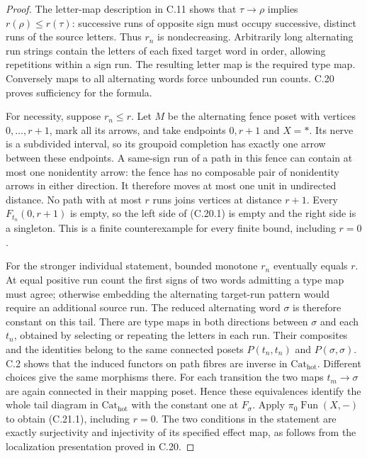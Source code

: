 \begin{proof}
The letter-map description in C.11 shows that $\tau\to\rho$
implies $r(\rho)\leq r(\tau)$: successive runs of opposite sign
must occupy successive, distinct runs of the source letters.
Thus $r_n$ is nondecreasing. Arbitrarily long alternating run
strings contain the letters of each fixed target word in order,
allowing repetitions within a sign run. The resulting letter map
is the required type map. Conversely maps to all alternating words
force unbounded run counts. C.20 proves sufficiency for the formula.

For necessity, suppose $r_n\leq r$. Let $M$ be the alternating
fence poset with vertices $0,\ldots,r+1$, mark all its arrows,
and take endpoints $0,r+1$ and $X=*$. Its nerve is a subdivided
interval, so its groupoid completion has exactly one arrow between
these endpoints. A same-sign run of a path in this fence can
contain at most one nonidentity arrow: the fence has no composable
pair of nonidentity arrows in either direction. It therefore moves
at most one unit in undirected distance. No path with at most $r$
runs joins vertices at distance $r+1$. Every $F_{t_n}(0,r+1)$
is empty, so the left side of (C.20.1) is empty and the right side
is a singleton. This is a finite counterexample for every finite
bound, including $r=0$.

For the stronger individual statement, bounded monotone $r_n$
eventually equals $r$. At equal positive run count the first signs
of two words admitting a type map must agree; otherwise embedding
the alternating target-run pattern would require an additional
source run. The reduced alternating word $\sigma$ is therefore
constant on this tail. There are type maps in both directions
between $\sigma$ and each $t_n$, obtained by selecting or
repeating the letters in each run. Their composites and the
identities belong to the same connected posets $P(t_n,t_n)$ and
$P(\sigma,\sigma)$. C.2 shows that the induced functors on path
fibres are inverse in $\mathrm{Cat}_{\mathrm{hot}}$. Different
choices give the same morphisms there. For each transition the
two maps $t_m\to\sigma$ are again connected in their mapping
poset. Hence these equivalences identify the whole tail diagram
in $\mathrm{Cat}_{\mathrm{hot}}$ with the constant one at
$F_\sigma$. Apply $\pi_0\operatorname{Fun}(X,-)$ to obtain
(C.21.1), including $r=0$. The two conditions in the statement are
exactly surjectivity and injectivity of its specified effect map,
as follows from the localization presentation proved in C.20.
\end{proof}

